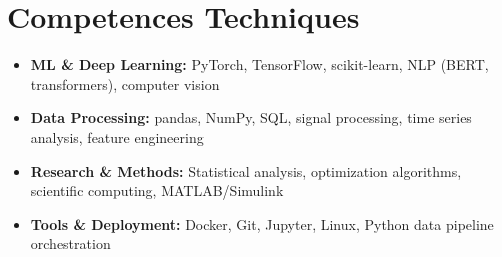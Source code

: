\documentclass[a4paper,11pt]{article}
\begin{document}
\section{Competences Techniques}
\begin{itemize}[leftmargin=*, nosep]
    \item \small{\textbf{ML \& Deep Learning:} PyTorch, TensorFlow, scikit-learn, NLP (BERT, transformers), computer vision}
    \item \small{\textbf{Data Processing:} pandas, NumPy, SQL, signal processing, time series analysis, feature engineering}
    \item \small{\textbf{Research \& Methods:} Statistical analysis, optimization algorithms, scientific computing, MATLAB/Simulink}
    \item \small{\textbf{Tools \& Deployment:} Docker, Git, Jupyter, Linux, Python data pipeline orchestration}
\end{itemize}
\end{document}
